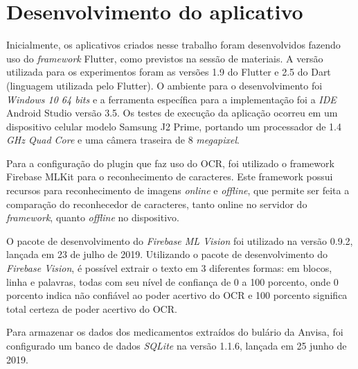 \section{Desenvolvimento do aplicativo}
Inicialmente, os aplicativos criados nesse trabalho foram desenvolvidos fazendo uso do \textit{framework} Flutter, como previstos na sessão de materiais. A versão utilizada para os experimentos foram as versões 1.9 do Flutter e 2.5 do Dart (linguagem utilizada pelo Flutter). O ambiente para o desenvolvimento foi \textit{Windows 10 64 bits} e a ferramenta específica para a implementação foi a \textit{IDE} Android Studio versão 3.5.
Os testes de execução da aplicação ocorreu em um dispositivo celular  modelo Samsung J2 Prime, portando um processador de 1.4 \textit{GHz Quad Core} e uma câmera traseira de 8 \textit{megapixel}. 

Para a configuração do plugin que faz uso do OCR, foi utilizado o framework Firebase MLKit para o reconhecimento de caracteres. Este framework possui recursos para reconhecimento de imagens
\textit{online} e \textit{offline},
que permite ser feita a comparação do reconhecedor de caracteres, tanto online no servidor do \textit{framework}, quanto \textit{offline} no dispositivo.

O pacote de desenvolvimento do \textit{Firebase ML Vision} foi utilizado na versão 0.9.2, lançada em 23 de julho de 2019.	Utilizando o pacote de desenvolvimento do \textit{Firebase Vision}, é possível extrair o texto em 3 diferentes formas: em blocos, linha e palavras, todas com seu nível de confiança de 0 a 100 porcento, onde 0 porcento indica não confiável ao poder acertivo do OCR e 100 porcento significa total certeza de poder acertivo do OCR.
 
 Para armazenar os dados dos medicamentos extraídos do bulário da Anvisa, foi configurado um banco de dados \textit{SQLite} na versão 1.1.6, lançada em 25 junho de 2019. 




